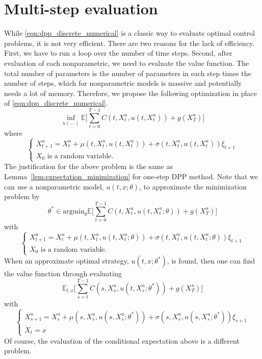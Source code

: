 \documentclass[11pt]{book}
\begin{document}
\section{Multi-step evaluation}
While \eqref{eqn:dpp_discrete_numerical} is a classic way to evaluate optimal control problems, it is not very efficient. There are two reasons for the lack of efficiency. First, we have to run a loop over the number of time steps. Second, after evaluation of each nonparametric, we need to evaluate the value function. The total number of parameters is the number of parameters in each step times the number of steps, which for nonparametric models is massive and  potentially needs a lot of memory. Therefore, we propose the following optimization in place of \eqref{eqn:dpp_discrete_numerical}.
\begin{equation}
     \inf_{u(\cdot,\cdot)} \mathbb{E}\bigg[\sum_{t=0}^{T-1}C(t,X^u_t,u(t,X^u_t))+g(X^u_T)\bigg]
\end{equation}
where
\begin{equation}
\begin{cases}
        X^u_{t+1} =X^u_{t}+\mu(t,X^u_{t},u(t,X^u_{t}))+\sigma(t,X^u_{t},u(t,X^u_{t}))\xi_{t+1}\\
        X_0\textrm{ is a random variable.}
\end{cases}
\end{equation}
The justification for the above problem is the same as Lemma~\ref{lem:expectation_minimization} for one-step DPP method. 
Note that we can use a nonparametric model, $u(t,x;\theta)$,  to approximate the minimization problem by
\begin{equation}
\theta^*\in \textrm{argmin}_{\theta}\mathbb{E}\bigg[\sum_{t=0}^{T-1}C(t,X^u_t,u(t,X^u_t;\theta))+g(X^u_T)\bigg]
\end{equation}
with 
\begin{equation}
\begin{cases}
        X^u_{t+1} =X^u_{t}+\mu(t,X^u_{t},u(t,X^u_{t};\theta))+\sigma(t,X^u_{t},u(t,X^u_{t};\theta))\xi_{t+1}\\
        X_0\textrm{ is a random variable.}
\end{cases}
\end{equation}
When an approximate optimal strategy, $u(t,x;\theta^*)$, is found, then one can find the value function through evaluating 
\begin{equation}
    \mathbb{E}_{t,x}\bigg[\sum_{s=t}^{T-1}C(s,X^u_s,u(t,X^u_s;\theta^*))+g(X^u_T)\bigg]
\end{equation}
with
\begin{equation}
\begin{cases}
        X^u_{s+1} =X^u_{s}+\mu(s,X^u_{s},u(s,X^u_{s};\theta^*))+\sigma(s,X^u_{s},u(s,X^u_{s};\theta^*))\xi_{s+1}\\
        X_t=x
\end{cases}
\end{equation}
Of course, the evaluation of the conditional expectation above is a different problem.
\end{document}
